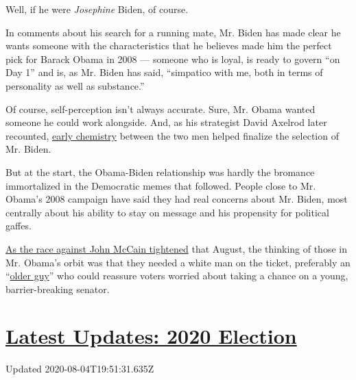 Well, if he were \emph{Josephine} Biden, of course.

In comments about his search for a running mate, Mr. Biden has made
clear he wants someone with the characteristics that he believes made
him the perfect pick for Barack Obama in 2008 --- someone who is loyal,
is ready to govern ``on Day 1'' and is, as Mr. Biden has said,
``simpatico with me, both in terms of personality as well as
substance.''

Of course, self-perception isn't always accurate. Sure, Mr. Obama wanted
someone he could work alongside. And, as his strategist David Axelrod
later recounted,
\href{https://www.usatoday.com/story/news/politics/onpolitics/2015/02/10/biden-vice-president-bayh-axelrod/81211852/}{early
chemistry} between the two men helped finalize the selection of Mr.
Biden.

But at the start, the Obama-Biden relationship was hardly the bromance
immortalized in the Democratic memes that followed. People close to Mr.
Obama's 2008 campaign have said they had real concerns about Mr. Biden,
most centrally about his ability to stay on message and his propensity
for political gaffes.

\href{https://blogs.wsj.com/washwire/2008/08/13/mccain-obama-race-enters-dead-heat/}{As
the race against John McCain tightened} that August, the thinking of
those in Mr. Obama's orbit was that they needed a white man on the
ticket, preferably an
``\href{https://www.nytimes3xbfgragh.onion/2019/08/16/us/politics/biden-obama-history.html}{older
guy}'' who could reassure voters worried about taking a chance on a
young, barrier-breaking senator.

\hypertarget{latest-updates-2020-election}{%
\section{\texorpdfstring{\href{https://www.nytimes3xbfgragh.onion/2020/08/04/us/elections/primary-election-michigan-arizona-kansas.html?action=click\&pgtype=Article\&state=default\&region=MAIN_CONTENT_1\&context=storylines_live_updates}{Latest
Updates: 2020
Election}}{Latest Updates: 2020 Election}}\label{latest-updates-2020-election}}

Updated 2020-08-04T19:51:31.635Z

